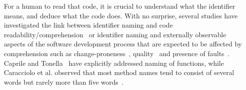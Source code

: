 \documentclass[conference]{IEEEtran}
\newcommand{\quotes}[1]{\textit{``#1''}}
\begin{document}
For a human to read that code, it is crucial to understand what the identifier means, and deduce what the code does. 
With no surprise, several studies have investigated the link between identifier naming and code readability/comprehension~\cite{AvidanF17,HofmeisterSH17,LawrieMFB07,TakangGM96,Teasley} or identifier naming and externally observable aspects of the software development process that are expected to be affected by comprehension such as change-proneness~\cite{AmanASK15}, quality~\cite{ButlerWYS10,LunguK13} and presence of faults~\cite{ScannielloR13,TramontanaRS14}.
Caprile and Tonella~\cite{CaprileTonella} have explicitly addressed naming of functions, while Caracciolo et al. observed that most method names tend to consist of several words but rarely more than five words~\cite{Caracciolo}.
%
\end{document}
